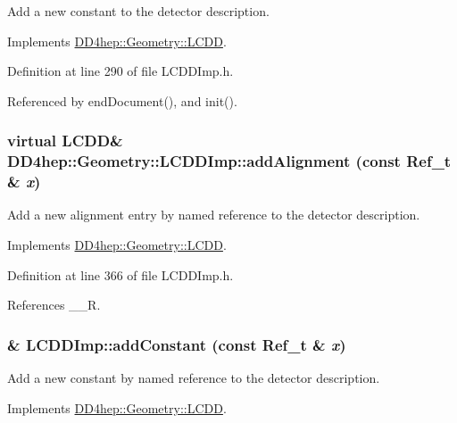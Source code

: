 Add a new constant to the detector description. 

Implements \hyperlink{class_d_d4hep_1_1_geometry_1_1_l_c_d_d_a438cd36346d10c381b99bdfaa80ba50e}{DD4hep::Geometry::LCDD}.

Definition at line 290 of file LCDDImp.h.

Referenced by endDocument(), and init().\hypertarget{class_d_d4hep_1_1_geometry_1_1_l_c_d_d_imp_a408e628b36591e17b7f44f7c3246be39}{
\subsubsection[{addAlignment}]{\setlength{\rightskip}{0pt plus 5cm}virtual {\bf LCDD}\& DD4hep::Geometry::LCDDImp::addAlignment (const {\bf Ref\_\-t} \& {\em x})}}
\label{class_d_d4hep_1_1_geometry_1_1_l_c_d_d_imp_a408e628b36591e17b7f44f7c3246be39}


Add a new alignment entry by named reference to the detector description. 

Implements \hyperlink{class_d_d4hep_1_1_geometry_1_1_l_c_d_d_a50e3654851b950da20f19a13e36fbcc4}{DD4hep::Geometry::LCDD}.

Definition at line 366 of file LCDDImp.h.

References \_\-\_\-R.\hypertarget{class_d_d4hep_1_1_geometry_1_1_l_c_d_d_imp_aec684bd86c26b609a33668364f595d96}{
\subsubsection[{addConstant}]{ \& LCDDImp::addConstant (const {\bf Ref\_\-t} \& {\em x})}}
\label{class_d_d4hep_1_1_geometry_1_1_l_c_d_d_imp_aec684bd86c26b609a33668364f595d96}


Add a new constant by named reference to the detector description. 

Implements \hyperlink{class_d_d4hep_1_1_geometry_1_1_l_c_d_d_ac2bc82eba942bd452da56bbf958d8aad}{DD4hep::Geometry::LCDD}.

